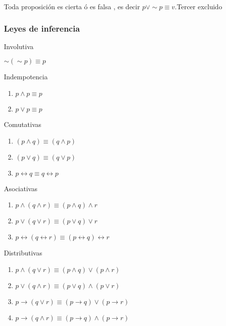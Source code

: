 \begin{axioma}{ Toda proposición es cierta ó es falsa , es decir
$p\vee\sim p\equiv v.$}{Tercer excluido}\end{axioma}


\subsubsection{Leyes de inferencia}

\begin{ley}{Involutiva}

$\sim\left(\sim p\right)\equiv p$

\end{ley}

\begin{ley}{Indempotencia}
\begin{enumerate}
\item $p\wedge p\equiv p$
\item $p\vee p\equiv p$
\end{enumerate}
\end{ley}

\begin{ley}{Comutativas}
\begin{enumerate}
\item $\left(p\wedge q\right)\equiv\left(q\wedge p\right)$
\item $\left(p\vee q\right)\equiv\left(q\vee p\right)$
\item $p\leftrightarrow q\equiv q\leftrightarrow p$
\end{enumerate}
\end{ley}

\begin{ley}{Asociativas}
\begin{enumerate}
\item $p\wedge\left(q\wedge r\right)\equiv\left(p\wedge q\right)\wedge r$
\item $p\vee\left(q\vee r\right)\equiv\left(p\vee q\right)\vee r$
\item $p\leftrightarrow\left(q\leftrightarrow r\right)\equiv\left(p\leftrightarrow q\right)\leftrightarrow r$
\end{enumerate}
\end{ley}

\begin{ley}{Distributivas}
\begin{enumerate}
\item $p\wedge\left(q\vee r\right)\equiv\left(p\wedge q\right)\vee\left(p\wedge r\right)$
\item $p\vee\left(q\wedge r\right)\equiv\left(p\vee q\right)\wedge\left(p\vee r\right)$
\item $p\rightarrow\left(q\vee r\right)\equiv\left(p\rightarrow q\right)\vee\left(p\rightarrow r\right)$
\item $p\rightarrow\left(q\wedge r\right)\equiv\left(p\rightarrow q\right)\wedge\left(p\rightarrow r\right)$
\end{enumerate}
\end{ley}

